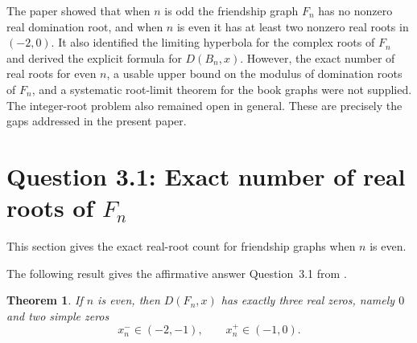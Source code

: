 \documentclass[12pt]{article}
\newtheorem{theorem}{Theorem}[section]
\theoremstyle{definition}
\begin{document}
	 The paper \cite{AlikhaniBrownJahari2016} showed that when $n$ is odd the friendship graph $F_n$ has no nonzero real domination root, and when $n$ is even it has at least two nonzero real roots in $(-2,0)$. It also identified the limiting hyperbola for the complex roots of $F_n$ and derived the explicit formula for $D(B_n,x)$. However, the exact number of real roots for even $n$, a usable upper bound on the modulus of domination roots of $F_n$, and a systematic root-limit theorem for the book graphs were not supplied. The integer-root problem also remained open in general. These are precisely the gaps addressed  in the present paper.
	
	\section{Question 3.1: Exact number of real roots of $F_n$}\label{section 3}
	
	This section gives the exact real-root count for friendship graphs when $n$ is even.
	
	The following result gives the affirmative answer  Question~3.1 from \cite{AlikhaniBrownJahari2016}.
	\begin{theorem} \label{thm:exactthree}
		If $n$ is even, then $D(F_n,x)$ has exactly three real zeros, namely $0$ and two simple zeros
		$$
		x_n^- \in (-2,-1), \qquad x_n^+ \in (-1,0).
		$$
	\end{theorem}
	
\end{document}
